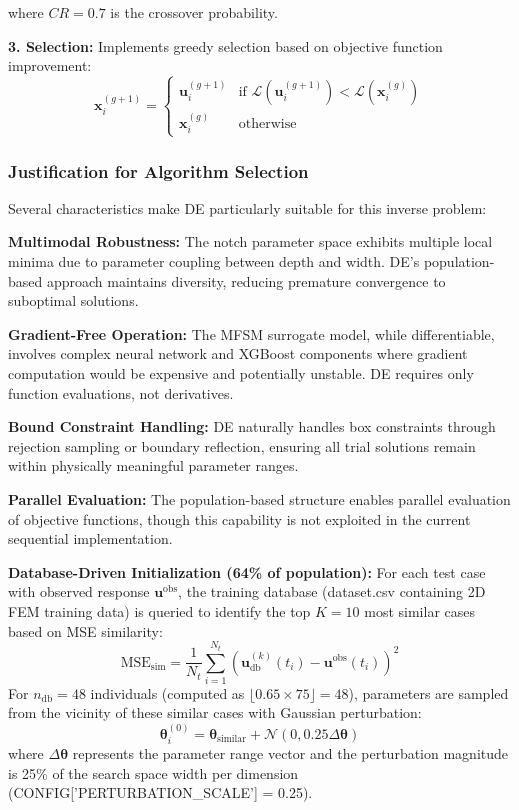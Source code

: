 \documentclass[12pt,a4paper]{report}
\begin{document}
where $CR = 0.7$ is the crossover probability.

\textbf{3. Selection:} Implements greedy selection based on objective function improvement:
\begin{equation}
\mathbf{x}_i^{(g+1)} = \begin{cases}
\mathbf{u}_i^{(g+1)} & \text{if } \mathcal{L}(\mathbf{u}_i^{(g+1)}) < \mathcal{L}(\mathbf{x}_i^{(g)}) \\
\mathbf{x}_i^{(g)} & \text{otherwise}
\end{cases}
\label{eq:de_selection}
\end{equation}

\subsubsection{Justification for Algorithm Selection}
Several characteristics make DE particularly suitable for this inverse problem:

\textbf{Multimodal Robustness:} The notch parameter space exhibits multiple local minima due to parameter coupling between depth and width. DE's population-based approach maintains diversity, reducing premature convergence to suboptimal solutions.

\textbf{Gradient-Free Operation:} The MFSM surrogate model, while differentiable, involves complex neural network and XGBoost components where gradient computation would be expensive and potentially unstable. DE requires only function evaluations, not derivatives.

\textbf{Bound Constraint Handling:} DE naturally handles box constraints through rejection sampling or boundary reflection, ensuring all trial solutions remain within physically meaningful parameter ranges.

\textbf{Parallel Evaluation:} The population-based structure enables parallel evaluation of objective functions, though this capability is not exploited in the current sequential implementation.

\textbf{Database-Driven Initialization (64\% of population):} For each test case with observed response $\mathbf{u}^{\text{obs}}$, the training database (dataset.csv containing 2D FEM training data) is queried to identify the top $K = 10$ most similar cases based on MSE similarity:
\begin{equation}
\text{MSE}_{\text{sim}} = \frac{1}{N_t} \sum_{i=1}^{N_t} \left( \mathbf{u}_{\text{db}}^{(k)}(t_i) - \mathbf{u}^{\text{obs}}(t_i) \right)^2
\label{eq:database_similarity}
\end{equation}
For $n_{\text{db}} = 48$ individuals (computed as $\lfloor 0.65 \times 75 \rfloor = 48$), parameters are sampled from the vicinity of these similar cases with Gaussian perturbation:
\begin{equation}
\boldsymbol{\theta}_i^{(0)} = \boldsymbol{\theta}_{\text{similar}} + \mathcal{N}(0, 0.25 \Delta \boldsymbol{\theta})
\label{eq:database_perturbation}
\end{equation}
where $\Delta \boldsymbol{\theta}$ represents the parameter range vector and the perturbation magnitude is 25\% of the search space width per dimension (CONFIG['PERTURBATION\_SCALE'] = 0.25).
\end{document}
